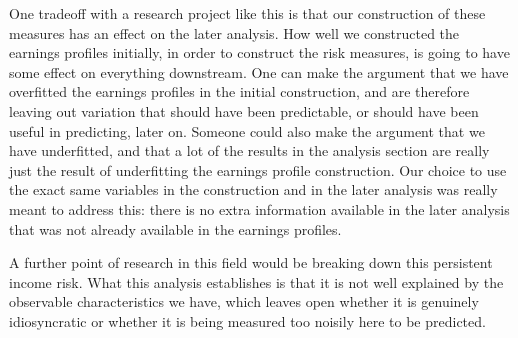 \documentclass[12pt]{article}
\begin{document}
\begin{onehalfspace}
One tradeoff with a research project like this is that our construction of these measures has an effect on the later analysis. How well we constructed the earnings profiles initially, in order to construct the risk measures, is going to have some effect on everything downstream. One can make the argument that we have overfitted the earnings profiles in the initial construction, and are therefore leaving out variation that should have been predictable, or should have been useful in predicting, later on. Someone could also make the argument that we have underfitted, and that a lot of the results in the analysis section are really just the result of underfitting the earnings profile construction. Our choice to use the exact same variables in the construction and in the later analysis was really meant to address this: there is no extra information available in the later analysis that was not already available in the earnings profiles.

A further point of research in this field would be breaking down this persistent income risk. What this analysis establishes is that it is not well explained by the observable characteristics we have, which leaves open whether it is genuinely idiosyncratic or whether it is being measured too noisily here to be predicted.


\end{onehalfspace}
\end{document}
